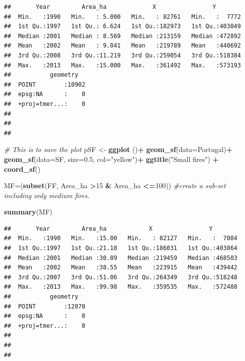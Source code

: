 \documentclass[
]{article}
\newenvironment{Shaded}{\begin{snugshade}}{\end{snugshade}}
\newcommand{\AttributeTok}[1]{\textcolor[rgb]{0.13,0.29,0.53}{#1}}
\newcommand{\CommentTok}[1]{\textcolor[rgb]{0.56,0.35,0.01}{\textit{#1}}}
\newcommand{\DecValTok}[1]{\textcolor[rgb]{0.00,0.00,0.81}{#1}}
\newcommand{\FloatTok}[1]{\textcolor[rgb]{0.00,0.00,0.81}{#1}}
\newcommand{\FunctionTok}[1]{\textcolor[rgb]{0.13,0.29,0.53}{\textbf{#1}}}
\newcommand{\NormalTok}[1]{#1}
\newcommand{\OtherTok}[1]{\textcolor[rgb]{0.56,0.35,0.01}{#1}}
\newcommand{\SpecialCharTok}[1]{\textcolor[rgb]{0.81,0.36,0.00}{\textbf{#1}}}
\newcommand{\StringTok}[1]{\textcolor[rgb]{0.31,0.60,0.02}{#1}}
\begin{document}
\begin{verbatim}
##       Year         Area_ha             X                Y         
##  Min.   :1990   Min.   : 5.000   Min.   : 82761   Min.   :  7772  
##  1st Qu.:1997   1st Qu.: 6.624   1st Qu.:182973   1st Qu.:403849  
##  Median :2001   Median : 8.569   Median :213159   Median :472892  
##  Mean   :2002   Mean   : 9.041   Mean   :219789   Mean   :440692  
##  3rd Qu.:2008   3rd Qu.:11.219   3rd Qu.:259054   3rd Qu.:518384  
##  Max.   :2013   Max.   :15.000   Max.   :361492   Max.   :573193  
##           geometry    
##  POINT        :10902  
##  epsg:NA      :    0  
##  +proj=tmer...:    0  
##                       
##                       
## 
\end{verbatim}

\begin{Shaded}
\begin{Highlighting}[]
\CommentTok{\# This is to save the plot }
\NormalTok{pSF }\OtherTok{\textless{}{-}} \FunctionTok{ggplot}\NormalTok{ ()}\SpecialCharTok{+}
  \FunctionTok{geom\_sf}\NormalTok{(}\AttributeTok{data=}\NormalTok{Portugal)}\SpecialCharTok{+}
  \FunctionTok{geom\_sf}\NormalTok{(}\AttributeTok{data=}\NormalTok{SF, }\AttributeTok{size=}\FloatTok{0.5}\NormalTok{, }\AttributeTok{col=}\StringTok{"yellow"}\NormalTok{)}\SpecialCharTok{+}
 \FunctionTok{ggtitle}\NormalTok{(}\StringTok{"Small fires"}\NormalTok{) }\SpecialCharTok{+}
 \FunctionTok{coord\_sf}\NormalTok{()}
\end{Highlighting}
\end{Shaded}

\begin{Shaded}
\begin{Highlighting}[]
\NormalTok{MF}\OtherTok{=}\NormalTok{(}\FunctionTok{subset}\NormalTok{(FF, Area\_ha }\SpecialCharTok{\textgreater{}}\DecValTok{15} \SpecialCharTok{\&}\NormalTok{ Area\_ha }\SpecialCharTok{\textless{}=}\DecValTok{100}\NormalTok{)) }\CommentTok{\#create a sub{-}set including only medium fires. }

\FunctionTok{summary}\NormalTok{(MF)}
\end{Highlighting}
\end{Shaded}

\begin{verbatim}
##       Year         Area_ha            X                Y         
##  Min.   :1990   Min.   :15.00   Min.   : 82127   Min.   :  7084  
##  1st Qu.:1997   1st Qu.:21.18   1st Qu.:186031   1st Qu.:403864  
##  Median :2001   Median :30.89   Median :219459   Median :468503  
##  Mean   :2002   Mean   :38.55   Mean   :223915   Mean   :439442  
##  3rd Qu.:2007   3rd Qu.:51.06   3rd Qu.:264349   3rd Qu.:518248  
##  Max.   :2013   Max.   :99.98   Max.   :359535   Max.   :572488  
##           geometry    
##  POINT        :12070  
##  epsg:NA      :    0  
##  +proj=tmer...:    0  
##                       
##                       
## 
\end{verbatim}
\end{document}
